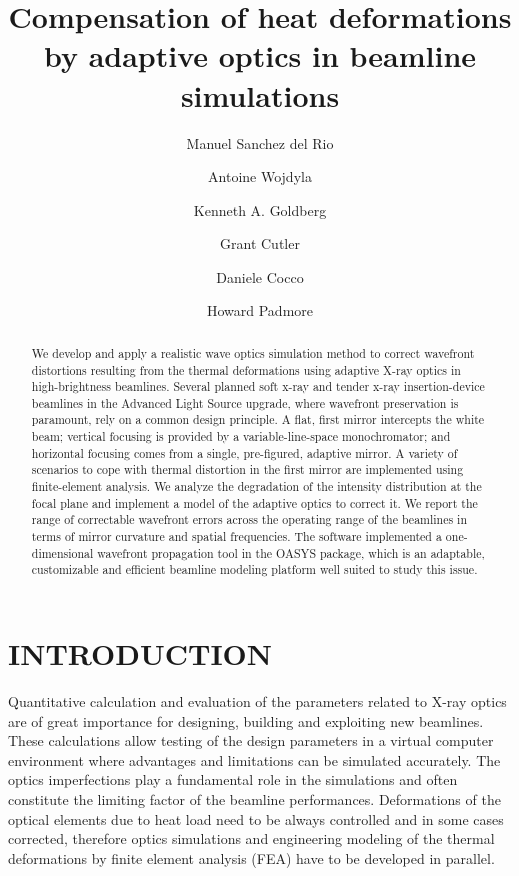 \documentclass[]{spie}  %
\title{Compensation of heat deformations by adaptive optics in beamline simulations}
\author[a]{Manuel Sanchez del Rio}
\author[a]{Antoine Wojdyla}
\author[a]{Kenneth A. Goldberg}
\author[a]{Grant Cutler}
\author[a]{Daniele Cocco}
\author[a]{Howard Padmore}
\affil[a]{LBNL, 1 Cyclotron Road, Berkeley CA, USA}
\begin{document}
 
\maketitle

\begin{abstract}
We develop and apply a realistic wave optics simulation method to correct wavefront distortions resulting from the thermal deformations using adaptive X-ray optics in high-brightness beamlines. Several planned soft x-ray and tender x-ray insertion-device beamlines in the Advanced Light Source upgrade, where wavefront preservation is paramount, rely on a common design principle. A flat, first mirror intercepts the white beam; vertical focusing is provided by a variable-line-space monochromator; and horizontal focusing comes from a single, pre-figured, adaptive mirror. 
A variety of scenarios to cope with thermal distortion in the first mirror are implemented using finite-element analysis. We analyze the degradation of the intensity distribution at the focal plane and implement a model of the adaptive optics to correct it. We report the range of correctable wavefront errors across the operating range of the beamlines in terms of mirror curvature and spatial frequencies. The software implemented a one-dimensional wavefront propagation tool in the OASYS package, which is an adaptable, customizable and efficient beamline modeling platform well suited to study this issue.
\end{abstract}


\section{INTRODUCTION}
\label{sec:intro}  

Quantitative calculation and evaluation of the parameters related to X-ray optics are of great importance for designing, building and exploiting new beamlines. These calculations allow testing of the design parameters in a virtual computer environment where advantages and limitations can be simulated accurately. The optics imperfections play a fundamental role in the simulations and often constitute the limiting factor of the beamline performances. Deformations of the optical elements due to heat load need to be always controlled and in some cases corrected, therefore optics simulations and engineering modeling of the thermal deformations by finite element analysis (FEA) have to be developed in parallel. 
\end{document}
